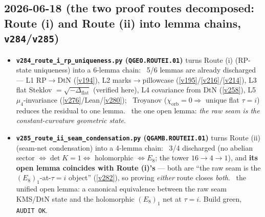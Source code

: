 \subsection*{2026-06-18 (the two proof routes decomposed: Route (i) and Route (ii) into lemma chains, \texttt{v284}/\texttt{v285})}
\begin{itemize}
\item \textbf{\texttt{v284\_route\_i\_rp\_uniqueness.py} (\texttt{QGEO.ROUTEI.01})} turns Route (i) (RP-state
  uniqueness) into a 6-lemma chain: \mE\ 5/6 lemmas are already discharged --- L1 RP$\to$DtN (\vref{v194}),
  L2 marks$\to$pillowcase (\vref{v195}/\vref{v216}/\vref{v214}), L3 flat Steklov $=\sqrt{-\Delta_{\mathrm{flat}}}$
  (verified here), L4 covariance from DtN (\vref{v258}), L5 $\mu_4$-invariance (\vref{v276}/Lean/\vref{v280}); \mC\
  Troyanov ($\chi_{\mathrm{orb}}{=}0\Rightarrow$ unique flat $\tau{=}i$) reduces the residual to one lemma. \mO\
  the one open lemma: \emph{the raw seam is the constant-curvature geometric state}.
\item \textbf{\texttt{v285\_route\_ii\_seam\_condensation.py} (\texttt{QGAMB.ROUTEII.01})} turns Route (ii)
  (seam-net condensation) into a 4-lemma chain: \mE\ 3/4 discharged (no abelian sector $\Leftrightarrow\det K{=}1
  \Leftrightarrow$ holomorphic $\Leftrightarrow E_8$; the tower $16{\to}4{\to}1$), and \textbf{its open lemma
  coincides with Route (i)'s} --- both are ``the raw seam is the $(E_8)_1$-at-$\tau{=}i$ object'' (\vref{v282}),
  so proving \emph{either} route closes \emph{both}. \mO\ the unified open lemma: a canonical equivalence
  between the raw seam KMS/DtN state and the holomorphic $(E_8)_1$ net at $\tau{=}i$. Build green, \texttt{AUDIT OK}.
\end{itemize}

